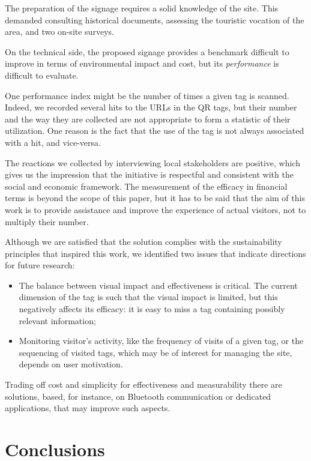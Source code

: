\documentclass[sustainability,article,submit,pdftex,moreauthors]{Definitions/mdpi}
\begin{document}
The preparation of the signage requires a solid knowledge of the site. This demanded consulting historical documents, assessing the touristic vocation of the area, and two on-site surveys.

On the technical side, the proposed signage provides a benchmark difficult to improve in terms of environmental impact and cost, but its {\em performance} is difficult to evaluate.

One performance index might be the number of times a given tag is scanned. Indeed, we recorded several hits to the URLs in the QR tags, but their number and the way they are collected are not appropriate to form a statistic of their utilization. One reason is the fact that the use of the tag is not always associated with a hit, and vice-versa.

The reactions we collected by interviewing local stakeholders are positive, which gives us the impression that the initiative is respectful and consistent with the social and economic framework. The measurement of the efficacy in financial terms is beyond the scope of this paper, but it has to be said that the aim of this work is to provide assistance and improve the experience of actual visitors, not to multiply their number.

Although we are satisfied that the solution complies with the sustainability principles that inspired this work, we identified two issues that indicate directions for future research:

\begin{itemize}
    \item The balance between visual impact and effectiveness is critical. The current dimension of the tag is such that the visual impact is limited, but this negatively affects its efficacy: it is easy to miss a tag containing possibly relevant information;
    \item Monitoring visitor's activity, like the frequency of visits of a given tag, or the sequencing of visited tags, which may be of interest for managing the site, depends on user motivation.
\end{itemize}

Trading off cost and simplicity for effectiveness and measurability there are solutions, based, for instance, on Bluetooth communication or dedicated applications, that may improve such aspects.

\section{Conclusions}
\end{document}
